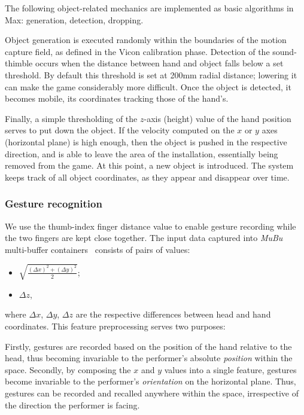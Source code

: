 \documentclass{nime-alternate}
\begin{document}
The following object-related mechanics are implemented as basic algorithms in Max: generation, detection, dropping.

Object generation is executed randomly within the boundaries of the motion capture field, as defined in the Vicon calibration phase. Detection of the sound-thimble occurs when the distance between hand and object falls below a set threshold. By default this threshold is set at 200mm radial distance; lowering it can make the game considerably more difficult. Once the object is detected, it becomes mobile, its coordinates tracking those of the hand's.

Finally, a simple thresholding of the $z$-axis (height) value of the hand position serves to put down the object. If the velocity computed on the $x$ or $y$ axes (horizontal plane) is high enough, then the object is pushed in the respective direction, and is able to leave the area of the installation, essentially being removed from the game.
At this point, a new object is introduced. The system keeps track of all object coordinates, as they appear and disappear over time.



\subsubsection{Gesture recognition}

We use the thumb-index finger distance value to enable gesture recording while the two fingers are kept close together. The input data captured into \textit{MuBu} multi-buffer containers~\cite{mubu} consists of pairs of values:
\begin{itemize}
	\item $\sqrt{\frac{(\Delta x)^2 + (\Delta y)^2}{2}}$;
	\item $\Delta z$,
\end{itemize}
where $\Delta x$, $\Delta y$, $\Delta z$ are the respective differences between head and hand coordinates. This feature preprocessing serves two purposes:

Firstly, gestures are recorded based on the position of the hand relative to the head, thus becoming invariable to the performer's absolute \textit{position} within the space. Secondly, by composing the $x$ and $y$ values into a single feature, gestures become invariable to the performer's \textit{orientation} on the horizontal plane. Thus, gestures can be recorded and recalled anywhere within the space, irrespective of the direction the performer is facing.
\end{document}
